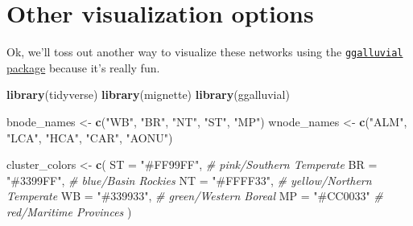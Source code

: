 \documentclass[
]{book}
\newenvironment{Shaded}{\begin{snugshade}}{\end{snugshade}}
\newcommand{\AttributeTok}[1]{\textcolor[rgb]{0.13,0.29,0.53}{#1}}
\newcommand{\CommentTok}[1]{\textcolor[rgb]{0.56,0.35,0.01}{\textit{#1}}}
\newcommand{\FunctionTok}[1]{\textcolor[rgb]{0.13,0.29,0.53}{\textbf{#1}}}
\newcommand{\NormalTok}[1]{#1}
\newcommand{\OtherTok}[1]{\textcolor[rgb]{0.56,0.35,0.01}{#1}}
\newcommand{\StringTok}[1]{\textcolor[rgb]{0.31,0.60,0.02}{#1}}
\begin{document}
\hypertarget{other-visualization-options}{%
\section{Other visualization options}\label{other-visualization-options}}

Ok, we'll toss out another way to visualize these networks using the \href{https://cran.r-project.org/web/packages/ggalluvial/vignettes/ggalluvial.htm}{\texttt{ggalluvial} package} because it's really fun.

\begin{Shaded}
\begin{Highlighting}[]
\FunctionTok{library}\NormalTok{(tidyverse)}
\FunctionTok{library}\NormalTok{(mignette)}
\FunctionTok{library}\NormalTok{(ggalluvial)}

\NormalTok{bnode\_names }\OtherTok{\textless{}{-}} \FunctionTok{c}\NormalTok{(}\StringTok{"WB"}\NormalTok{, }\StringTok{"BR"}\NormalTok{, }\StringTok{"NT"}\NormalTok{, }\StringTok{"ST"}\NormalTok{, }\StringTok{"MP"}\NormalTok{)}
\NormalTok{wnode\_names }\OtherTok{\textless{}{-}} \FunctionTok{c}\NormalTok{(}\StringTok{"ALM"}\NormalTok{, }\StringTok{"LCA"}\NormalTok{, }\StringTok{"HCA"}\NormalTok{, }\StringTok{"CAR"}\NormalTok{, }\StringTok{"AONU"}\NormalTok{)}

\NormalTok{cluster\_colors }\OtherTok{\textless{}{-}}  \FunctionTok{c}\NormalTok{(}
  \StringTok{\textasciigrave{}}\AttributeTok{ST}\StringTok{\textasciigrave{}} \OtherTok{=} \StringTok{"\#FF99FF"}\NormalTok{, }\CommentTok{\# pink/Southern Temperate}
  \StringTok{\textasciigrave{}}\AttributeTok{BR}\StringTok{\textasciigrave{}} \OtherTok{=} \StringTok{"\#3399FF"}\NormalTok{, }\CommentTok{\# blue/Basin Rockies}
  \StringTok{\textasciigrave{}}\AttributeTok{NT}\StringTok{\textasciigrave{}} \OtherTok{=} \StringTok{"\#FFFF33"}\NormalTok{, }\CommentTok{\# yellow/Northern Temperate}
  \StringTok{\textasciigrave{}}\AttributeTok{WB}\StringTok{\textasciigrave{}} \OtherTok{=} \StringTok{"\#339933"}\NormalTok{, }\CommentTok{\# green/Western Boreal}
  \StringTok{\textasciigrave{}}\AttributeTok{MP}\StringTok{\textasciigrave{}} \OtherTok{=} \StringTok{"\#CC0033"} \CommentTok{\# red/Maritime Provinces}
\NormalTok{) }


\end{Highlighting}
\end{Shaded}
\end{document}
